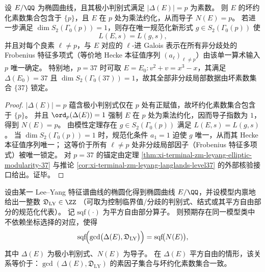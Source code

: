 \begin{proposition}\label{prop:xi-prime-bad-set-determines-unramified-data}
设 \(E/\QQ\) 为椭圆曲线，且其极小判别式满足 \(|\Delta(E)|=p\) 为素数。
则 \(E\) 的坏约化素数集合包含于 \(\{p\}\)，且 \(E\) 在 \(p\) 处为乘法约化，从而导子 \(N(E)=p\)。
若进一步满足 \(\dim S_2(\Gamma_0(p))=1\)，则存在唯一规范化新形式 \(g\in S_2(\Gamma_0(p))\) 使
\[
L(E,s)=L(g,s),
\]
并且对每个良素 \(\ell\neq p\)，与 \(E\) 对应的 \(\ell\)-进 Galois 表示在所有非分歧处的 Frobenius 特征多项式（等价地 Hecke 本征值序列 \((a_\ell)_{\ell\neq p}\)）由该单一算术输入 \(p\) 唯一确定。
特别地，\(p=37\) 时可取 \(E=E_0: v^2+v=x^3-x\)，其满足 \(\Delta(E_0)=37\) 且 \(\dim S_2(\Gamma_0(37))=1\)，故其全部非分歧局部数据由坏素数集合 \(\{37\}\) 锁定。
\end{proposition}
\begin{proof}
\(|\Delta(E)|=p\) 蕴含极小判别式仅在 \(p\) 处有正赋值，故坏约化素数集合包含于 \(\{p\}\)。
并且 \(\ord_p(\Delta(E))=1\) 强制 \(E\) 在 \(p\) 处为乘法约化，因而导子指数为 \(1\)，得到 \(N(E)=p\)。
由模性定理存在 \(g\in S_2(\Gamma_0(p))\) 满足 \(L(E,s)=L(g,s)\)。
当 \(\dim S_2(\Gamma_0(p))=1\) 时，规范化条件 \(a_1=1\) 迫使 \(g\) 唯一，从而其 Hecke 本征值序列唯一；
这等价于所有 \(\ell\neq p\) 处非分歧局部因子（Frobenius 特征多项式）被唯一锁定。
对 \(p=37\) 的锚定由定理 \ref{thm:xi-terminal-zm-leyang-elliptic-modularity-37} 与推论 \ref{cor:xi-terminal-zm-leyang-langlands-level37} 的外部核验接口给出。证毕。
\end{proof}

\begin{conjecture}\label{conj:xi-leyang-discriminant-gcd-conductor-principle}
设由某一 Lee--Yang 特征谱曲线的椭圆化得到椭圆曲线 \(E/\QQ\)，并设模型内禀地给出一整数
\(\mathfrak D_{\mathrm{LY}}\in\ZZ\)
（可取为控制临界值/分歧的判别式、结式或其平方自由部分的规范化代表）。
记 \(\mathrm{sqf}(\cdot)\) 为平方自由部分算子。
则预期存在同一模型类中不依赖坐标选择的对应，使得
\[
\mathrm{sqf}\!\Bigl(\gcd\bigl(\Delta(E),\mathfrak D_{\mathrm{LY}}\bigr)\Bigr)
=
\mathrm{sqf}\!\bigl(N(E)\bigr),
\]
其中 \(\Delta(E)\) 为极小判别式、\(N(E)\) 为导子。
在 \(\Delta(E)\) 平方自由的情形，该关系等价于：\(\gcd(\Delta(E),\mathfrak D_{\mathrm{LY}})\) 的素因子集合与坏约化素数集合一致。
\end{conjecture}

